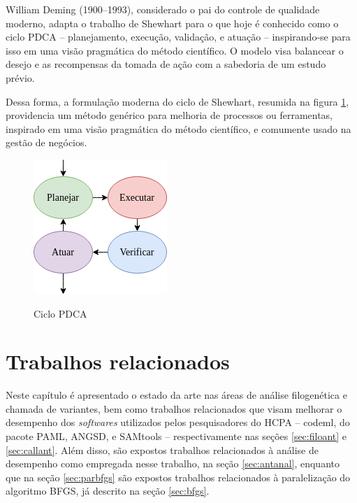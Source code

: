\documentclass[cic,tc]{iiufrgs}
\begin{document}
William Deming (1900--1993), considerado o pai do controle de qualidade
moderno, adapta o trabalho de Shewhart para o que hoje é conhecido como o ciclo
PDCA -- planejamento, execução, validação, e atuação -- inspirando-se para
isso em uma visão pragmática do método científico. O modelo visa balancear o
desejo e as recompensas da tomada de ação com a sabedoria de um estudo prévio.

Dessa forma, a formulação moderna do ciclo de Shewhart, resumida na figura
\ref{fig:pdca_orig}, providencia um método genérico para melhoria de processos ou
ferramentas, inspirado em uma visão pragmática do método científico, e
comumente usado na gestão de negócios.

\begin{figure} \caption{Ciclo PDCA} \begin{center}
\includegraphics[width=0.25\linewidth]{img/pdca_orig.png} \end{center}
 \label{fig:pdca_orig} \end{figure}


%
%
%
%

\chapter{Trabalhos relacionados}
\label{chap:anteriores}

Neste capítulo é apresentado o estado da arte nas áreas de análise filogenética
e chamada de variantes, bem como trabalhos relacionados que visam melhorar o
desempenho dos \textit{softwares} utilizados pelos pesquisadores do HCPA --
codeml, do pacote PAML, ANGSD, e SAMtools -- respectivamente nas seções
\ref{sec:filoant} e \ref{sec:callant}. Além disso, são expostos trabalhos
relacionados à análise de desempenho como empregada nesse trabalho, na seção
\ref{sec:antanal}, enquanto que na seção \ref{sec:parbfgs} são expostos
trabalhos relacionados à paralelização do algoritmo BFGS, já descrito na seção
\ref{sec:bfgs}.
\end{document}
